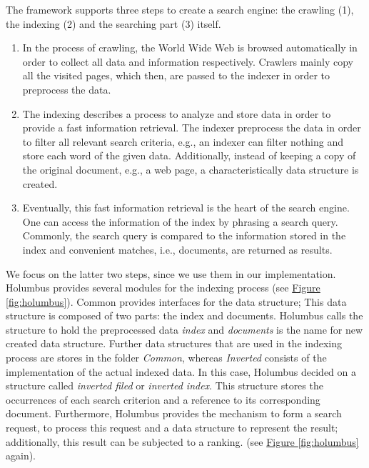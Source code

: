 \documentclass[%
	latex,%
	a4paper,%
	oneside,%
	chapterprefix,%
	headsepline,%
	12pt%
]{scrbook}
\begin{document}
The framework supports three steps to create a search engine: the
crawling (1), the indexing (2) and the searching part (3) itself. %
\begin{enumerate} 
\item In the process of crawling, the World Wide Web is browsed
  automatically in order to collect all data and information
  respectively. %
  Crawlers mainly copy all the visited pages, which then, are passed
  to the indexer in order to preprocess the data. %
\item The indexing describes a process to analyze and store data in
  order to provide a fast information retrieval. %
  The indexer preprocess the data in order to filter all relevant
  search criteria, e.g., an indexer can filter nothing and store each
  word of the given data. %
  Additionally, instead of keeping a copy of the original document,
  e.g., a web page, a characteristically data structure
  is created. %
\item Eventually, this fast information retrieval is the heart of the
  search engine. %
  One can access the information of the index by phrasing a search
  query. %
  Commonly, the search query is compared to the information stored in
  the index and convenient matches, i.e., documents, are returned as
  results. %
\end{enumerate}
We focus on the latter two steps, since we use them in our
implementation. %
Holumbus provides several modules for the indexing process (see
\hyperref[fig:holumbus]{Figure \ref*{fig:holumbus}}). %
Common provides interfaces for the data structure; This data structure
is composed of two parts: the index and documents. %
Holumbus calls the structure to hold the preprocessed data
\emph{index} and \emph{documents} is the name for new created data
structure. %
Further data structures that are used in the indexing process are
stores in the folder \emph{Common}, whereas \emph{Inverted} consists
of the implementation of the actual indexed data. %
In this case, Holumbus decided on a structure called \emph{inverted
  filed} or \emph{inverted index}. %
This structure stores the occurrences of each search criterion and a
reference to its corresponding document. %
Furthermore, Holumbus provides the mechanism to form a search request,
to process this request and a data structure to represent the result;
additionally, this result can be subjected to a ranking. %
(see \hyperref[fig:holumbus]{Figure \ref*{fig:holumbus}} again). %
\end{document}
